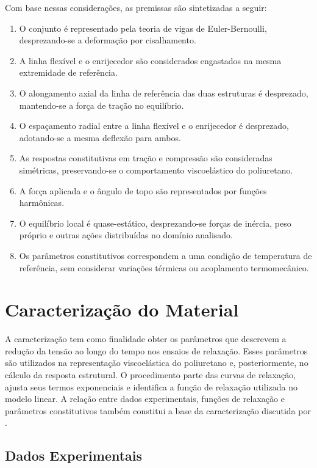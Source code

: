 \documentclass[arial,centeredequations,english,brazilian,oneside,section=TITLE]{ifes8}
\begin{document}
Com base nessas considerações, as premissas são sintetizadas a seguir:
\begin{enumerate}
  \item O conjunto é representado pela teoria de vigas de Euler-Bernoulli, desprezando-se
  a deformação por cisalhamento.
  \item A linha flexível e o enrijecedor são considerados engastados na mesma extremidade
  de referência.
  \item O alongamento axial da linha de referência das duas estruturas é desprezado,
  mantendo-se a força de tração no equilíbrio.
  \item O espaçamento radial entre a linha flexível e o enrijecedor é desprezado,
  adotando-se a mesma deflexão para ambos.
  \item As respostas constitutivas em tração e compressão são consideradas simétricas,
  preservando-se o comportamento viscoelástico do poliuretano.
  \item A força aplicada e o ângulo de topo são representados por funções harmônicas.
  \item O equilíbrio local é quase-estático, desprezando-se forças de inércia,
  peso próprio e outras ações distribuídas no domínio analisado.
  \item Os parâmetros constitutivos correspondem a uma condição de temperatura de referência,
  sem considerar variações térmicas ou acoplamento termomecânico.
\end{enumerate}

\section{Caracterização do Material}
\label{sec:caracterizacao-do-material}

A caracterização tem como finalidade obter os parâmetros que descrevem a redução da tensão
ao longo do tempo nos ensaios de relaxação. Esses parâmetros são utilizados
na representação viscoelástica do poliuretano e, posteriormente, no cálculo da resposta
estrutural. O procedimento parte das curvas de relaxação, ajusta seus termos exponenciais e
identifica a função de relaxação utilizada no modelo linear. A relação entre dados experimentais, funções de relaxação e
parâmetros constitutivos também constitui a base da caracterização discutida por
.

\subsection{Dados Experimentais}
\label{sec:dados-experimentais}
\end{document}
